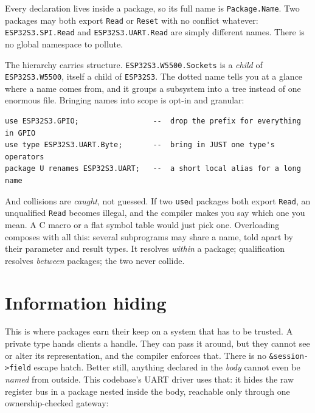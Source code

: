 Every declaration lives inside a package, so its full name is \texttt{Package.Name}.
Two packages may both export \texttt{Read} or \texttt{Reset} with no conflict
whatever: \texttt{ESP32S3.SPI.Read} and \texttt{ESP32S3.UART.Read} are simply
different names. There is no global namespace to pollute.


The hierarchy carries structure. \texttt{ESP32S3.W5500.Sockets} is a \emph{child} of
\texttt{ESP32S3.W5500}, itself a child of \texttt{ESP32S3}. The dotted name tells you
at a glance where a name comes from, and it groups a subsystem into a tree instead of
one enormous file. Bringing names into scope is opt-in and granular:

\begin{lstlisting}
use ESP32S3.GPIO;                 --  drop the prefix for everything in GPIO
use type ESP32S3.UART.Byte;       --  bring in JUST one type's operators
package U renames ESP32S3.UART;   --  a short local alias for a long name
\end{lstlisting}

\noindent
And collisions are \emph{caught}, not guessed. If two \texttt{use}d packages both
export \texttt{Read}, an unqualified \texttt{Read} becomes illegal, and the compiler
makes you say which one you mean. A C macro or a flat symbol table would just pick
one. Overloading composes with all this: several subprograms may share a name, told
apart by their parameter and result types. It resolves \emph{within} a package;
qualification resolves \emph{between} packages; the two never collide.

\section{Information hiding}

This is where packages earn their keep on a system that has to be trusted. A private
type hands clients a handle. They can pass it around, but they cannot see or alter
its representation, and the compiler enforces that. There is no
\texttt{\&session->field} escape hatch. Better still, anything declared in the
\emph{body} cannot even be \emph{named} from outside. This codebase's UART driver
uses that: it hides the raw register bus in a package nested inside the body,
reachable only through one ownership-checked gateway:

